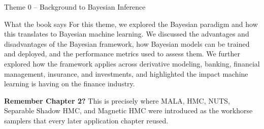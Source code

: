 \documentclass[aspectratio=169,10pt]{beamer}
\begin{document}
\begin{frame}{Theme 0 -- Background to Bayesian Inference}
  \begin{block}{What the book says}
    For this theme, we explored the Bayesian paradigm and how this
    translates to Bayesian machine learning. We discussed the advantages
    and disadvantages of the Bayesian framework, how Bayesian models can
    be trained and deployed, and the performance metrics used to assess
    them. We further explored how the framework applies across derivative
    modeling, banking, financial management, insurance, and investments,
    and highlighted the impact machine learning is having on the finance
    industry.
  \end{block}
  \textbf{Remember Chapter 2?} This is precisely where MALA, HMC, NUTS,
  Separable Shadow HMC, and Magnetic HMC were introduced as the workhorse
  samplers that every later application chapter reused.
\end{frame}
\end{document}
